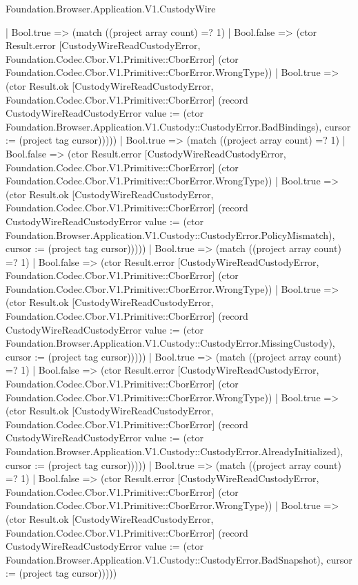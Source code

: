 \begin{lexlean}{Foundation.Browser.Application.V1.CustodyWire}
\begin{semanticmodule}
{                  | Bool.true => (match ((project array count) =? 1)
                    | Bool.false => (ctor Result.error [CustodyWireReadCustodyError, Foundation.Codec.Cbor.V1.Primitive::CborError] (ctor Foundation.Codec.Cbor.V1.Primitive::CborError.WrongType))
                    | Bool.true => (ctor Result.ok [CustodyWireReadCustodyError, Foundation.Codec.Cbor.V1.Primitive::CborError] (record CustodyWireReadCustodyError {value := (ctor Foundation.Browser.Application.V1.Custody::CustodyError.BadBindings), cursor := (project tag cursor)}))))
                | Bool.true => (match ((project array count) =? 1)
                  | Bool.false => (ctor Result.error [CustodyWireReadCustodyError, Foundation.Codec.Cbor.V1.Primitive::CborError] (ctor Foundation.Codec.Cbor.V1.Primitive::CborError.WrongType))
                  | Bool.true => (ctor Result.ok [CustodyWireReadCustodyError, Foundation.Codec.Cbor.V1.Primitive::CborError] (record CustodyWireReadCustodyError {value := (ctor Foundation.Browser.Application.V1.Custody::CustodyError.PolicyMismatch), cursor := (project tag cursor)}))))
              | Bool.true => (match ((project array count) =? 1)
                | Bool.false => (ctor Result.error [CustodyWireReadCustodyError, Foundation.Codec.Cbor.V1.Primitive::CborError] (ctor Foundation.Codec.Cbor.V1.Primitive::CborError.WrongType))
                | Bool.true => (ctor Result.ok [CustodyWireReadCustodyError, Foundation.Codec.Cbor.V1.Primitive::CborError] (record CustodyWireReadCustodyError {value := (ctor Foundation.Browser.Application.V1.Custody::CustodyError.MissingCustody), cursor := (project tag cursor)}))))
            | Bool.true => (match ((project array count) =? 1)
              | Bool.false => (ctor Result.error [CustodyWireReadCustodyError, Foundation.Codec.Cbor.V1.Primitive::CborError] (ctor Foundation.Codec.Cbor.V1.Primitive::CborError.WrongType))
              | Bool.true => (ctor Result.ok [CustodyWireReadCustodyError, Foundation.Codec.Cbor.V1.Primitive::CborError] (record CustodyWireReadCustodyError {value := (ctor Foundation.Browser.Application.V1.Custody::CustodyError.AlreadyInitialized), cursor := (project tag cursor)}))))
          | Bool.true => (match ((project array count) =? 1)
            | Bool.false => (ctor Result.error [CustodyWireReadCustodyError, Foundation.Codec.Cbor.V1.Primitive::CborError] (ctor Foundation.Codec.Cbor.V1.Primitive::CborError.WrongType))
            | Bool.true => (ctor Result.ok [CustodyWireReadCustodyError, Foundation.Codec.Cbor.V1.Primitive::CborError] (record CustodyWireReadCustodyError {value := (ctor Foundation.Browser.Application.V1.Custody::CustodyError.BadSnapshot), cursor := (project tag cursor)}))))
}
\end{semanticmodule}
\end{lexlean}
